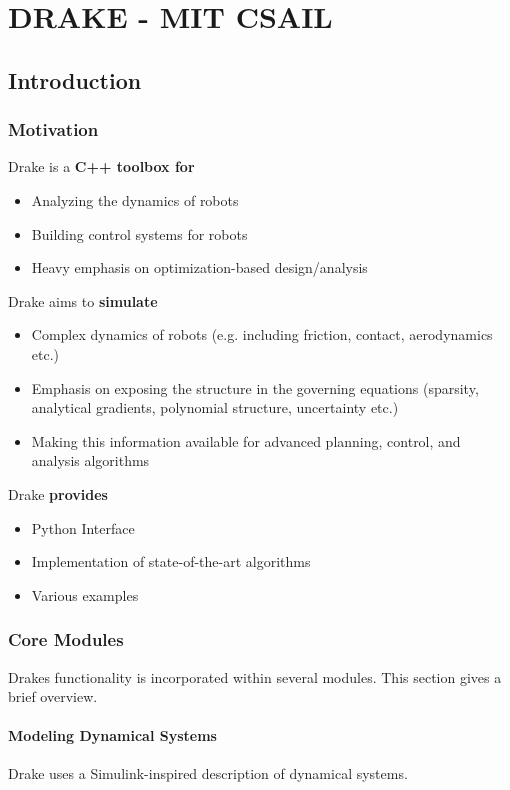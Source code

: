\chapter{DRAKE - MIT CSAIL}
\section{Introduction}
\subsection{Motivation}
Drake \cite{drake} is a \textbf{C++ toolbox for}
\begin{itemize}
\item Analyzing the dynamics of robots
\item Building control systems for robots
\item Heavy emphasis on optimization-based design/analysis
\end{itemize}

Drake aims to \textbf{simulate} 
\begin{itemize}
\item Complex dynamics of robots (e.g. including friction, contact, aerodynamics etc.)
\item Emphasis on exposing the structure in the governing equations (sparsity, analytical gradients, polynomial structure, uncertainty etc.)
\item Making this information available for advanced planning, control, and analysis algorithms
\end{itemize}

Drake \textbf{provides}
\begin{itemize}
\item Python Interface
\item Implementation of state-of-the-art algorithms
\item Various examples
\end{itemize}

\subsection{Core Modules}
Drakes functionality is incorporated within several modules. This section gives a brief overview. 
\subsubsection{Modeling Dynamical Systems}
Drake uses a Simulink-inspired description of dynamical systems.

